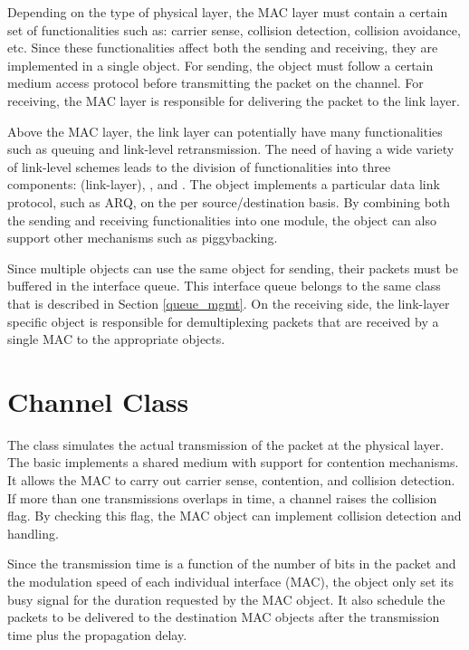 Depending on the type of physical layer, the MAC layer must contain a
certain set of functionalities such as: carrier sense, collision
detection, collision avoidance, etc.  Since these functionalities affect
both the sending and receiving, they are implemented in a single
 object.  For sending, the  object must follow a certain
medium access protocol before transmitting the packet on the channel.
For receiving, the MAC layer is responsible for delivering the packet to
the link layer.

Above the MAC layer, the link layer can potentially have many
functionalities such as queuing and link-level retransmission.  The need
of having a wide variety of link-level schemes leads to the division of
functionalities into three components:  (link-layer),
, and .  The  object implements
a particular data link protocol, such as ARQ, on the per
source/destination basis.  By combining both the sending and receiving
functionalities into one module, the  object can also support
other mechanisms such as piggybacking.

Since multiple  objects can use the same  object for
sending, their packets must be buffered in the interface queue.  This
interface queue belongs to the same  class that is described
in Section \ref{queue_mgmt}.  On the receiving side, the link-layer
specific  object is responsible for demultiplexing
packets that are received by a single MAC to the appropriate 
objects.


\section{Channel Class}
\label{sec:channel}

The  class simulates the actual transmission of the packet
at the physical layer.  The basic  implements a shared
medium with support for contention mechanisms.  It allows the MAC to
carry out carrier sense, contention, and collision detection.  If more
than one transmissions overlaps in time, a channel raises the collision
flag.  By checking this flag, the MAC object can implement collision detection
and handling.

Since the transmission time is a function of the number of bits in the
packet and the modulation speed of each individual interface (MAC), the
 object only set its busy signal for the duration
requested by the MAC object.  It also schedule the packets to be
delivered to the destination MAC objects after the transmission time
plus the propagation delay.

